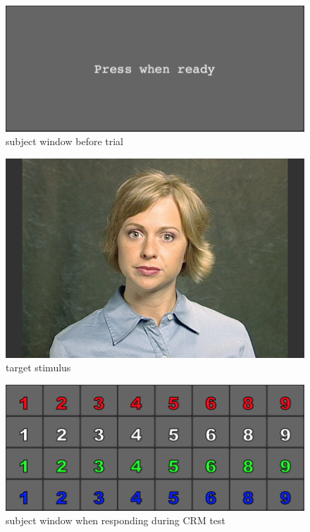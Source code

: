 \documentclass[11pt,pdftex,letterpaper]{article}
\begin{document}
\begin{figure}
\centering
\includegraphics[width = 0.9\linewidth]{subject-ready-window.png}
\caption{subject window before trial}
\label{fig:subject-ready-window}
\end{figure}

\begin{figure}
\centering
\includegraphics[width = 0.9\linewidth]{target-stimulus.png}
\caption{target stimulus}
\label{fig:target-stimulus}
\end{figure}

\begin{figure}
\centering
\includegraphics[width = 0.9\linewidth]{coordinate-response-window.png}
\caption{subject window when responding during CRM test}
\label{fig:coordinate-response-window}
\end{figure}
\end{document}
